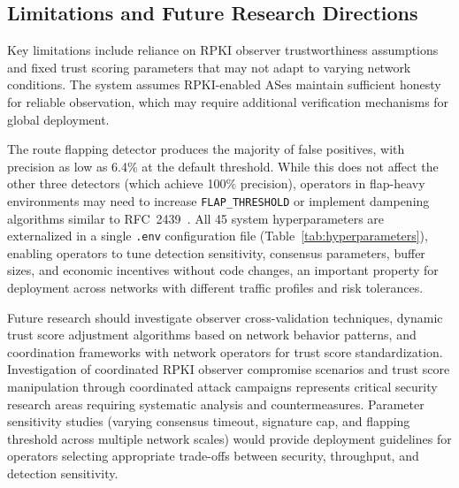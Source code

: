 \subsection{Limitations and Future Research Directions}

Key limitations include reliance on RPKI observer trustworthiness assumptions and fixed trust scoring parameters that may not adapt to varying network conditions. The system assumes RPKI-enabled ASes maintain sufficient honesty for reliable observation, which may require additional verification mechanisms for global deployment.

The route flapping detector produces the majority of false positives, with precision as low as 6.4\% at the default threshold. While this does not affect the other three detectors (which achieve 100\% precision), operators in flap-heavy environments may need to increase \texttt{FLAP\_THRESHOLD} or implement dampening algorithms similar to RFC~2439~\cite{rfc2439}. All 45 system hyperparameters are externalized in a single \texttt{.env} configuration file (Table~\ref{tab:hyperparameters}), enabling operators to tune detection sensitivity, consensus parameters, buffer sizes, and economic incentives without code changes, an important property for deployment across networks with different traffic profiles and risk tolerances.

Future research should investigate observer cross-validation techniques, dynamic trust score adjustment algorithms based on network behavior patterns, and coordination frameworks with network operators for trust score standardization. Investigation of coordinated RPKI observer compromise scenarios and trust score manipulation through coordinated attack campaigns represents critical security research areas requiring systematic analysis and countermeasures. Parameter sensitivity studies (varying consensus timeout, signature cap, and flapping threshold across multiple network scales) would provide deployment guidelines for operators selecting appropriate trade-offs between security, throughput, and detection sensitivity.

